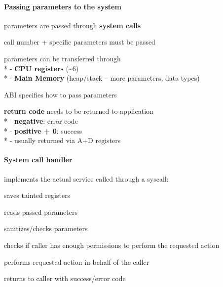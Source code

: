 \paragraph{Passing parameters to the system}
\begin{items}
  \item parameters are passed through \textbf{system calls}
  \item call number + specific parameters must be passed
  \item parameters can be transferred through \\*
    - \textbf{CPU registers} (\textasciitilde 6) \\*
    - \textbf{Main Memory} (heap/stack -- more parameters, data types)
  \item ABI specifies how to pass parameters
  \item \textbf{return code} needs to be returned to application \\*
    - \textbf{negative}: error code \\*
    - \textbf{positive + 0}: success \\*
    - usually returned via A+D registers
\end{items}

\paragraph{System call handler}
\begin{items}
  \item implements the actual service called through a syscall:
  \begin{enumeration}
    \item saves tainted registers
    \item reads passed parameters
    \item sanitizes/checks parameters
    \item checks if caller has enough permissions to perform the requested action
    \item performs requested action in behalf of the caller
    \item returns to caller with success/error code
  \end{enumeration}
\end{items}


